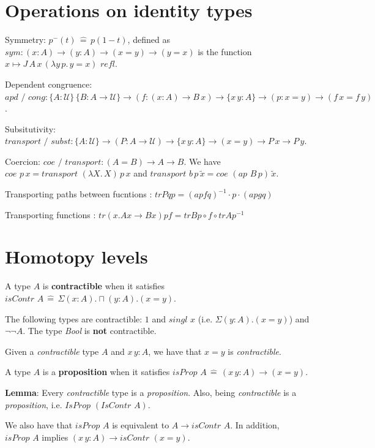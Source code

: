 \documentclass[a4paper]{article}
\begin{document}
\section*{Operations on identity types}

Symmetry: $p^-(t) \, \hat{=} \, p(1 - t)$, defined as $sym : (x : A) \to (y : A) \to (x = y) \to (y = x)$ is the function $x \mapsto J \, A \, x \, (\lambda y \, p. \, y = x) \textit{ refl}$.

Dependent congruence: $\textit{apd / cong} : \{A : \mathcal{U}\} \, \{B : A \to \mathcal{U}\} \to (f : (x : A) \to B \, x) \to \{x \, y : A\} \to (p : x = y) \to (f \, x = f \, y)$.

Subsitutivity: $\textit{transport / subst} : \{A : \mathcal{U}\} \to (P : A \to \mathcal{U}) \to \{x \, y : A\} \to (x = y) \to P \, x \to P \, y$.

Coercion: $\textit{coe / transport} : (A = B) \to A \to B$. We have $\textit{coe } p \, x = \textit{transport } (\lambda X. \, X) \, p \, x$ and $\textit{transport } b \, p \, \tilde{x} = \textit{coe } (\textit{ap } B \, p) \, \tilde{x}$.

Transporting paths between fucntions : $tr P q p = (ap f q)^{-1} \cdot p \cdot (ap g q)$

Transporting functions : $tr (x. A x \to B x) p f = tr B p \circ f \circ tr A p^{-1}$

\section*{Homotopy levels}

A type $A$ is \textbf{contractible} when it satisfies $\textit{isContr } A \, \hat{=} \, \Sigma(x : A).\sqcap(y : A).(x = y)$.

The following types are contractible: $1$ and $\textit{singl } x$ (i.e. $\Sigma(y : A).(x = y)$) and $\neg \neg A$. The type \textit{Bool} is \textbf{not} contractible.

Given a \textit{contractible} type $A$ and $x \, y : A$, we have that $x = y$ is \textit{contractible}.

A type $A$ is a \textbf{proposition} when it satisfies $\textit{isProp } A \, \hat{=} \, (x \, y : A) \to (x = y)$.

\textbf{Lemma}: Every \textit{contractible} type is a \textit{proposition}. Also, being \textit{contractible} is a \textit{proposition}, i.e. $\textit{IsProp }(\textit{IsContr } A)$.

We also have that $\textit{isProp } A$ is equivalent to $A \to \textit{isContr } A$. In addition, $\textit{isProp } A$ implies $(x \, y : A) \to \textit{isContr }(x = y)$.
\end{document}

